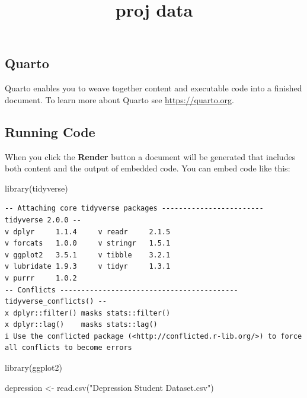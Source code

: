 \documentclass[
  letterpaper,
  DIV=11,
  numbers=noendperiod]{scrartcl}
\title{proj data}
\author{}
\date{}
\newenvironment{Shaded}{\begin{snugshade}}{\end{snugshade}}
\newcommand{\FunctionTok}[1]{\textcolor[rgb]{0.28,0.35,0.67}{#1}}
\newcommand{\NormalTok}[1]{\textcolor[rgb]{0.00,0.23,0.31}{#1}}
\newcommand{\OtherTok}[1]{\textcolor[rgb]{0.00,0.23,0.31}{#1}}
\newcommand{\StringTok}[1]{\textcolor[rgb]{0.13,0.47,0.30}{#1}}
\begin{document}
\maketitle


\subsection{Quarto}\label{quarto}

Quarto enables you to weave together content and executable code into a
finished document. To learn more about Quarto see
\url{https://quarto.org}.

\subsection{Running Code}\label{running-code}

When you click the \textbf{Render} button a document will be generated
that includes both content and the output of embedded code. You can
embed code like this:

\begin{Shaded}
\begin{Highlighting}[]
\FunctionTok{library}\NormalTok{(tidyverse)}
\end{Highlighting}
\end{Shaded}

\begin{verbatim}
-- Attaching core tidyverse packages ------------------------ tidyverse 2.0.0 --
v dplyr     1.1.4     v readr     2.1.5
v forcats   1.0.0     v stringr   1.5.1
v ggplot2   3.5.1     v tibble    3.2.1
v lubridate 1.9.3     v tidyr     1.3.1
v purrr     1.0.2     
-- Conflicts ------------------------------------------ tidyverse_conflicts() --
x dplyr::filter() masks stats::filter()
x dplyr::lag()    masks stats::lag()
i Use the conflicted package (<http://conflicted.r-lib.org/>) to force all conflicts to become errors
\end{verbatim}

\begin{Shaded}
\begin{Highlighting}[]
\FunctionTok{library}\NormalTok{(ggplot2)}
\end{Highlighting}
\end{Shaded}

\begin{Shaded}
\begin{Highlighting}[]
\NormalTok{depression }\OtherTok{\textless{}{-}} \FunctionTok{read.csv}\NormalTok{(}\StringTok{"Depression Student Dataset.csv"}\NormalTok{)}
\end{Highlighting}
\end{Shaded}
\end{document}
